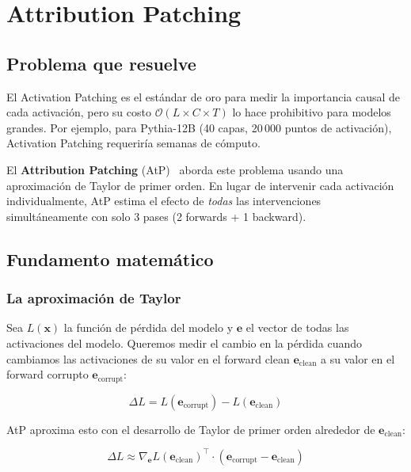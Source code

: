 \documentclass[11pt,a4paper]{report}
\theoremstyle{definition}
\begin{document}
\newpage

\chapter{Attribution Patching}
\label{ch:attribution-patching}

\section{Problema que resuelve}

El Activation Patching es el estándar de oro para medir la importancia causal de cada activación, pero su costo $\mathcal{O}(L \times C \times T)$ lo hace prohibitivo para modelos grandes. Por ejemplo, para Pythia-12B (40 capas, 20\,000 puntos de activación), Activation Patching requeriría semanas de cómputo.

El \textbf{Attribution Patching} (AtP)~\cite{nanda2022attributionpatching} aborda este problema usando una aproximación de Taylor de primer orden. En lugar de intervenir cada activación individualmente, AtP estima el efecto de \emph{todas} las intervenciones simultáneamente con solo 3 pases (2 forwards + 1 backward).

\section{Fundamento matemático}

\subsection{La aproximación de Taylor}

Sea $L(\mathbf{x})$ la función de pérdida del modelo y $\mathbf{e}$ el vector de todas las activaciones del modelo. Queremos medir el cambio en la pérdida cuando cambiamos las activaciones de su valor en el forward clean $\mathbf{e}_{\text{clean}}$ a su valor en el forward corrupto $\mathbf{e}_{\text{corrupt}}$:

\[
\Delta L = L(\mathbf{e}_{\text{corrupt}}) - L(\mathbf{e}_{\text{clean}})
\]

AtP aproxima esto con el desarrollo de Taylor de primer orden alrededor de $\mathbf{e}_{\text{clean}}$:

\[
\Delta L \approx \nabla_{\mathbf{e}} L(\mathbf{e}_{\text{clean}})^\top \cdot (\mathbf{e}_{\text{corrupt}} - \mathbf{e}_{\text{clean}})
\]
\end{document}

